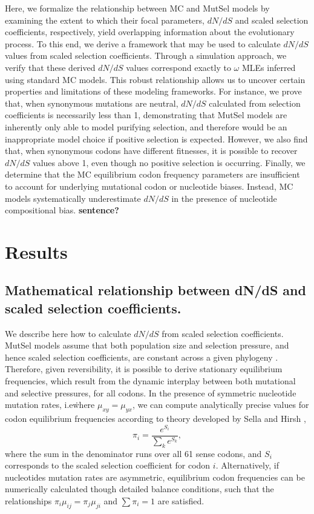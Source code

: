 \documentclass{pnastwo}
\begin{document}
\begin{article}
Here, we formalize the relationship between MC and MutSel models by examining the extent to which their focal parameters, $dN/dS$ and scaled selection coefficients, respectively, yield overlapping information about the evolutionary process. To this end, we derive a framework that may be used to calculate $dN/dS$ values from scaled selection coefficients. Through a simulation approach, we verify that these derived $dN/dS$ values correspond exactly to $\omega$ MLEs inferred using standard MC models. This robust relationship allows us to uncover certain properties and limitations of these modeling frameworks. For instance, we prove that, when synonymous mutations are neutral, $dN/dS$ calculated from selection coefficients is necessarily less than 1, demonstrating that MutSel models are inherently only able to model purifying selection, and therefore would be an inappropriate model choice if positive selection is expected. However, we also find that, when synonymous codons have different fitnesses, it is possible to recover $dN/dS$ values above 1, even though no positive selection is occurring. Finally, we determine that the MC equilibrium codon frequency parameters are insufficient to account for underlying mutational codon or nucleotide biases. Instead, MC models systematically underestimate $dN/dS$ in the presence of nucleotide compositional bias. \textbf{sentence?}


\section*{Results}


\subsection*{Mathematical relationship between dN/dS and scaled selection coefficients.}


We describe here how to calculate $dN/dS$ from scaled selection coefficients. MutSel models assume that both population size and selection pressure, and hence scaled selection coefficients, are constant across a given phylogeny \cite{HalpernBruno1998,YangNielsen2008,Thorne2012}. Therefore, given reversibility, it is possible to derive stationary equilibrium frequencies, which result from the dynamic interplay between both mutational and selective pressures, for all codons. In the presence of symmetric nucleotide mutation rates, i.e\. where $\mu_{xy} = \mu_{yx}$, we can compute analytically precise values for codon equilibrium frequencies according to theory developed by Sella and Hirsh \cite{SellaHirsh2005}, 
\begin{equation}\label{eq:pi_i}
 \pi_i=\frac{e^{S_i}}{\sum_k e^{S_k}}, 
 \end{equation} 
 where the sum in the denominator runs over all 61 sense codons, and $S_i$ corresponds to the scaled selection coefficient for codon $i$. Alternatively, if nucleotides mutation rates are asymmetric, equilibrium codon frequencies can be numerically calculated though detailed balance conditions, such that the relationships 
 $\pi_i\mu_{ij} = \pi_j\mu_{ji}$ and $\sum\pi_i = 1$ are satisfied.
 

\end{article}
\end{document}
